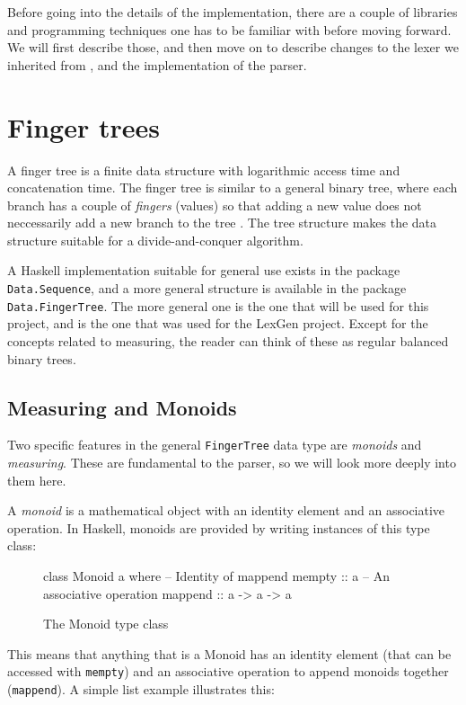 \documentclass[a4paper,12pt,twosided]{report}
\renewcommand\cite{\citep}
\begin{document}
Before going into the details of the implementation, there are a
couple of libraries and programming techniques one has to be familiar with
before moving forward. We will first describe those, and then move on to
describe changes to the lexer we inherited from \citet{divconqlex}, and the
implementation of the parser.

\section{Finger trees}
A finger tree is a finite data structure with logarithmic access time and
concatenation time. The finger tree is similar to a general binary tree, where each
branch has a couple of \textit{fingers} (values) so that adding a new value does
not neccessarily add a new branch to the tree \cite{fingertrees}. The tree
structure makes the data structure suitable for a divide-and-conquer algorithm.

A Haskell implementation suitable for general use exists in the package
\texttt{Data.Sequence}, and a more general structure is available in the
package \texttt{Data.FingerTree}. The more general one is the one that will be
used for this project, and is the one that was used for the LexGen project.
Except for the concepts related to measuring, the reader can think of these as
regular balanced binary trees. 

\subsection{Measuring and Monoids}
Two specific features in the general \texttt{FingerTree} data type are
\textit{monoids} and \textit{measuring}. These are fundamental to the parser, so
we will look more deeply into them here. 

A \textit{monoid} is a mathematical object with an identity element and an
associative operation. In Haskell, monoids are provided by writing instances of
this type class:
\begin{figure}[H]
\begin{code}
class Monoid a where
    -- Identity of mappend
    mempty  :: a
    -- An associative operation
    mappend :: a -> a -> a
\end{code}
\caption{The Monoid type class}
\end{figure}

This means that anything that is a Monoid has an identity element (that can be
accessed with \texttt{mempty}) and an associative operation to append monoids
together (\texttt{mappend}). A simple list example illustrates this:
\end{document}
